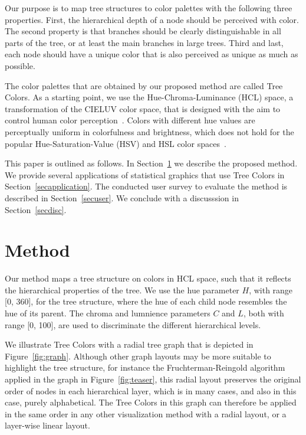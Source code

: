 \documentclass[journal]{vgtc}                %
\begin{document}
Our purpose is to map tree structures to color palettes with the following three properties. First, the hierarchical depth of a node should be perceived with color. The second property is that branches should be clearly distinguishable in all parts of the tree, or at least the main branches in large trees. Third and last, each node should have a unique color that is also perceived as unique as much as possible.

The color palettes that are obtained by our proposed method are called Tree Colors. As a starting point, we use the Hue-Chroma-Luminance (HCL) space, a transformation of the CIELUV color space, that is designed with the aim to control human color perception~\cite{ihaka2003}. Colors with different hue values are perceptually uniform in colorfulness and brightness, which does not hold for the popular Hue-Saturation-Value (HSV) and HSL color spaces~\cite{zeileis2009}.

This paper is outlined as follows. In Section~\ref{secmethod} we describe the proposed method. We provide several applications of statistical graphics that use Tree Colors in Section~\ref{secapplication}. The conducted user survey to evaluate the method is described in Section~\ref{secuser}. We conclude with a discusssion in Section~\ref{secdisc}.

\section{Method}\label{secmethod}
Our method maps a tree structure on colors in HCL space, such that it reflects the hierarchical properties of the tree. We use the hue parameter $H$, with range [0, 360], for the tree structure, where the hue of each child node resembles the hue of its parent. The chroma and lumnience parameters $C$ and $L$, both with range [0, 100], are used to discriminate the different hierarchical levels.

We illustrate Tree Colors with a radial tree graph that is depicted in Figure~\ref{fig:graph}. Although other graph layouts may be more suitable to highlight the tree structure, for instance the Fruchterman-Reingold algorithm~\cite{Fruchterman91} applied in the graph in Figure~\ref{fig:teaser}, this radial layout preserves the original order of nodes in each hierarchical layer, which is in many cases, and also in this case, purely alphabetical. The Tree Colors in this graph can therefore be applied in the same order in any other visualization method with a radial layout, or a  layer-wise linear layout. %
\end{document}
